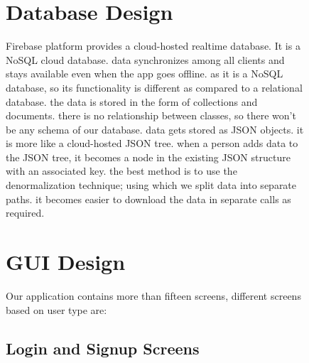 \begin{figure}
\section{Database Design}
Firebase platform provides a cloud-hosted realtime database. It is a NoSQL cloud database. data synchronizes among all clients and stays available even when the app goes offline. as it is a NoSQL database, so its functionality is different as compared to a relational database. the data is stored in the form of collections and documents. there is no relationship between classes, so there won’t be any schema of our database. data gets stored as JSON objects. it is more like a cloud-hosted JSON tree. when a person adds data to the JSON tree, it becomes a node in the existing JSON structure with an associated key. the best method is to use the denormalization technique; using which we split data into separate paths. it becomes easier to download the data in separate calls as required.
\end{figure}

\begin{figure}
\section{GUI Design}
Our application contains more than fifteen screens, different screens based on user type are:
\end{figure}



\begin{figure}
\subsection{Login and Signup Screens}
\hspace*{\fill}
\hfill 
{}
\hspace*{\fill}

\end{figure}

\begin{figure}
\hspace*{\fill}
\hfill 
{}
\hspace*{\fill}
\end{figure}

